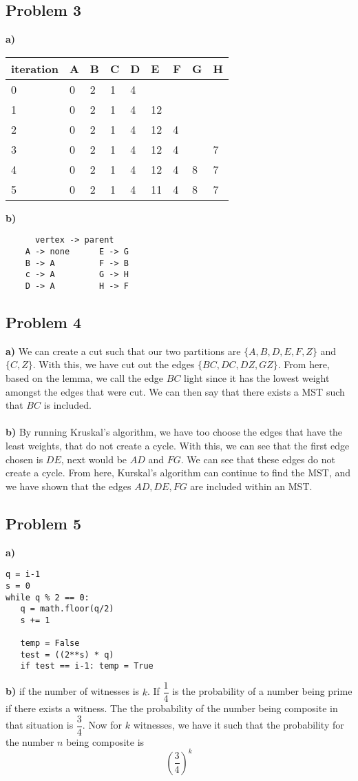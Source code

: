 \documentclass[12pt]{article}
\begin{document}
\subsection*{Problem 3}
\textbf{a)}
\begin{table}[!h]
\centering
\begin{tabular}{|l|l|l|l|l|l|l|l|l|}
\hline
iteration & A & B & C & D & E & F & G & H \\ \hline
0 & 0 & 2 & 1 & 4 &  &  &  &  \\ \hline
1 & 0 & 2 & 1 & 4 & 12 &  &  &  \\ \hline
2 & 0 & 2 & 1 & 4 & 12 & 4 &  &  \\ \hline
3 & 0 & 2 & 1 & 4 & 12 & 4 &  & 7 \\ \hline
4 & 0 & 2 & 1 & 4 & 12 & 4 & 8 & 7 \\ \hline
5 & 0 & 2 & 1 & 4 & 11 & 4 & 8 & 7 \\ \hline
\end{tabular}
\end{table}
\textbf{b)}
\begin{verbatim}
      vertex -> parent
    A -> none      E -> G
    B -> A         F -> B
    c -> A         G -> H
    D -> A         H -> F
\end{verbatim}
\newpage
\subsection*{Problem 4}
\textbf{a)} We can create a cut such that our two partitions are $\{ A, B, D, E, F, Z \}$ and $\{ C, Z \}$. With this, we have cut out the edges $\{ BC, DC, DZ, GZ \}$. From here, based on the lemma, we call the edge $BC$ light since it has the lowest weight amongst the edges that were cut. We can then say that there exists a MST such that $BC$ is included.\\\\
\textbf{b)}
By running Kruskal's algorithm, we have too choose the edges that have the least weights, that do not create a cycle. With this, we can see that the first edge chosen is $DE$, next would be $AD$ and $FG$. We can see that these edges do not create a cycle. From here, Kurskal's algorithm can continue to find the MST, and we have shown that the edges $AD, DE, FG$ are included within an MST.
\subsection*{Problem 5}
\textbf{a)}
\begin{verbatim}
q = i-1
s = 0
while q % 2 == 0:
   q = math.floor(q/2)
   s += 1

   temp = False
   test = ((2**s) * q)
   if test == i-1: temp = True
\end{verbatim}
\textbf{b)}
if the number of witnesses is $k$. If $\dfrac{1}{4}$ is the probability of a number being prime if there exists a witness. The the probability of the number being composite in that situation is $\dfrac{3}{4}$. Now for $k$ witnesses, we have it such that the probability for the number $n$ being composite is
\[ \left( \dfrac{3}{4} \right)^k \]
\end{document}

